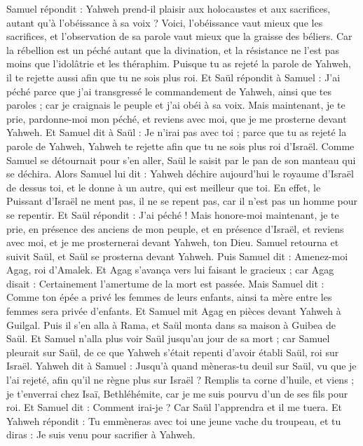 \begin{multicols}{2}
Samuel répondit : Yahweh prend-il plaisir aux holocaustes et aux sacrifices, autant qu'à l'obéissance à sa voix ? Voici, l'obéissance vaut mieux que les sacrifices, et l'observation de sa parole vaut mieux que la graisse des béliers.
Car la rébellion est un péché autant que la divination, et la résistance ne l'est pas moins que l'idolâtrie et les théraphim. Puisque tu as rejeté la parole de Yahweh, il te rejette aussi afin que tu ne sois plus roi.
Et Saül répondit à Samuel : J'ai péché parce que j'ai transgressé le commandement de Yahweh, ainsi que tes paroles ; car je craignais le peuple et j'ai obéi à sa voix.
Mais maintenant, je te prie, pardonne-moi mon péché, et reviens avec moi, que je me prosterne devant Yahweh.
Et Samuel dit à Saül : Je n'irai pas avec toi ; parce que tu as rejeté la parole de Yahweh, Yahweh te rejette afin que tu ne sois plus roi d'Israël.
Comme Samuel se détournait pour s'en aller, Saül le saisit par le pan de son manteau qui se déchira.
Alors Samuel lui dit : Yahweh déchire aujourd'hui le royaume d'Israël de dessus toi, et le donne à un autre, qui est meilleur que toi.
En effet, le Puissant d'Israël ne ment pas, il ne se repent pas, car il n'est pas un homme pour se repentir.
Et Saül répondit : J'ai péché ! Mais honore-moi maintenant, je te prie, en présence des anciens de mon peuple, et en présence d'Israël, et reviens avec moi, et je me prosternerai devant Yahweh, ton Dieu.
Samuel retourna et suivit Saül, et Saül se prosterna devant Yahweh.
Puis Samuel dit : Amenez-moi Agag, roi d'Amalek. Et Agag s'avança vers lui faisant le gracieux ; car Agag disait : Certainement l'amertume de la mort est passée.
Mais Samuel dit : Comme ton épée a privé les femmes de leurs enfants, ainsi ta mère entre les femmes sera privée d'enfants. Et Samuel mit Agag en pièces devant Yahweh à Guilgal.
Puis il s'en alla à Rama, et Saül monta dans sa maison à Guibea de Saül.
Et Samuel n'alla plus voir Saül jusqu'au jour de sa mort ; car Samuel pleurait sur Saül, de ce que Yahweh s'était repenti d'avoir établi Saül, roi sur Israël.
\VerseOne{}Yahweh dit à Samuel : Jusqu'à quand mèneras-tu deuil sur Saül, vu que je l'ai rejeté, afin qu'il ne règne plus sur Israël ? Remplis ta corne d'huile, et viens ; je t'enverrai chez Isaï, Bethléhémite, car je me suis pourvu d'un de ses fils pour roi.
Et Samuel dit : Comment irai-je ? Car Saül l'apprendra et il me tuera. Et Yahweh répondit : Tu emmèneras avec toi une jeune vache du troupeau, et tu diras : Je suis venu pour sacrifier à Yahweh.

\end{multicols}
